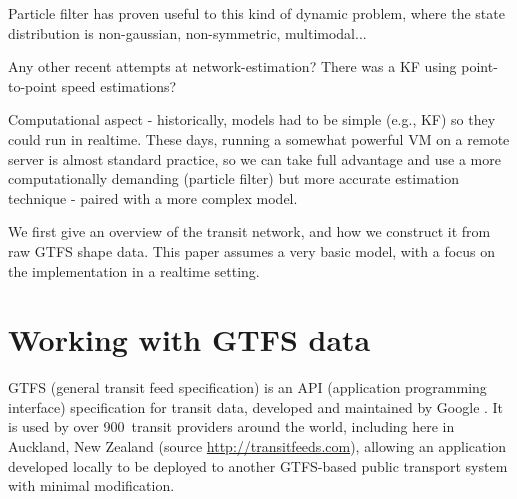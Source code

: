 \documentclass[times, doublespace]{anzsauth}
\begin{document}




Particle filter has proven useful to this kind of dynamic problem,
where the state distribution is non-gaussian, non-symmetric, 
multimodal...

Any other recent attempts at network-estimation?
There was a KF using point-to-point speed estimations? 

Computational aspect - historically, models had to be simple 
(e.g., KF) so they could run in realtime.
These days, running a somewhat powerful VM on a remote server
is almost standard practice, so we can take full advantage 
and use a more computationally demanding (particle filter)
but more accurate estimation technique - paired with a more complex model.

We first give an overview of the transit network,
and how we construct it from raw GTFS shape data.
This paper assumes a very basic model,
with a focus on the implementation in a realtime setting.




\section{Working with GTFS data}
\label{sec:gtfs}

GTFS (general transit feed specification)
is an API (application programming interface) specification for transit data,
developed and maintained by Google \citep{GoogleDevelopers_2006}.
It is used by over 900~transit providers around the world,
including here in Auckland, New Zealand
(source \url{http://transitfeeds.com}),
allowing an application developed locally to
be deployed to another GTFS-based public transport system with minimal modification.
\end{document}
